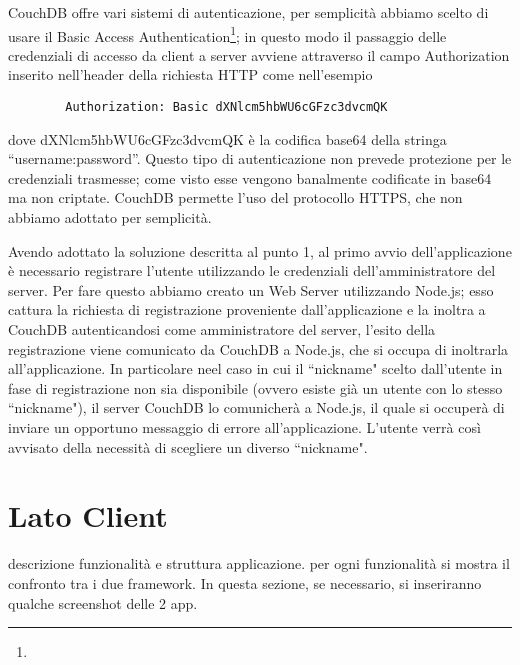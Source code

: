 		CouchDB offre vari sistemi di autenticazione, per semplicità abbiamo scelto 
		di usare il Basic Access Authentication\footnote{}; in questo modo il passaggio delle 
		credenziali di accesso da client a server avviene attraverso 
		il campo Authorization inserito nell'header della richiesta HTTP 
		come nell'esempio 
		\begin{lstlisting}
		Authorization: Basic dXNlcm5hbWU6cGFzc3dvcmQK
		\end{lstlisting}
		dove dXNlcm5hbWU6cGFzc3dvcmQK è la codifica base64 della stringa 
		``username:password''.
		Questo tipo di autenticazione non prevede protezione per le credenziali 
		trasmesse; come visto esse vengono banalmente codificate in base64 ma non 
		criptate. CouchDB permette l'uso del protocollo HTTPS, che non abbiamo adottato 
		per semplicità.
		
		Avendo adottato la soluzione descritta al punto 1, al primo avvio dell'applicazione 
		è necessario registrare l'utente utilizzando le credenziali dell'amministratore 
		del server. Per fare questo abbiamo creato un Web Server utilizzando Node.js; 
		esso cattura la richiesta di registrazione proveniente dall'applicazione 
		e la inoltra a CouchDB autenticandosi come amministratore del server, 
		l'esito della registrazione viene comunicato da CouchDB a Node.js, che 
		si occupa di inoltrarla all'applicazione. In particolare neel caso in cui il ``nickname"
		scelto dall'utente in fase di registrazione non sia disponibile 
		(ovvero esiste già un utente con lo stesso ``nickname"), il server CouchDB 
		lo comunicherà a Node.js, il quale si occuperà di inviare un opportuno 
		messaggio di errore all'applicazione. L'utente verrà così avvisato della 
		necessità di scegliere un diverso ``nickname".
	\section{Lato Client}
		descrizione funzionalità e struttura applicazione. per ogni funzionalità
		si mostra il confronto tra i due framework. In questa sezione, se 
		necessario, si inseriranno qualche screenshot delle 2 app.
